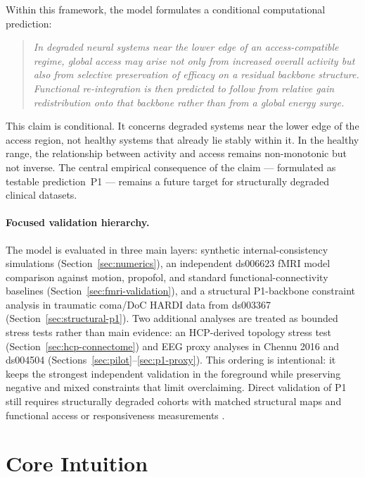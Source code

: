 \documentclass[11pt,a4paper]{article}
\theoremstyle{plain}
\theoremstyle{definition}
\theoremstyle{remark}
\begin{document}
Within this framework, the model formulates a conditional computational prediction:

\begin{quote}
\itshape
In degraded neural systems near the lower edge of an access-compatible regime, global access may arise not only from increased overall activity but also from selective preservation of efficacy on a residual backbone structure. Functional re-integration is then predicted to follow from relative gain redistribution onto that backbone rather than from a global energy surge.
\end{quote}

This claim is conditional. It concerns degraded systems near the lower edge of the access region, not healthy systems that already lie stably within it. In the healthy range, the relationship between activity and access remains non-monotonic but not inverse. The central empirical consequence of the claim --- formulated as testable prediction~P1 --- remains a future target for structurally degraded clinical datasets.

\paragraph{Focused validation hierarchy.}
The model is evaluated in three main layers: synthetic internal-consistency simulations (Section~\ref{sec:numerics}), an independent ds006623 fMRI model comparison against motion, propofol, and standard functional-connectivity baselines (Section~\ref{sec:fmri-validation}), and a structural P1-backbone constraint analysis in traumatic coma/DoC HARDI data from ds003367 (Section~\ref{sec:structural-p1}). Two additional analyses are treated as bounded stress tests rather than main evidence: an HCP-derived topology stress test (Section~\ref{sec:hcp-connectome}) and EEG proxy analyses in Chennu 2016 and ds004504 (Sections~\ref{sec:pilot}--\ref{sec:p1-proxy}). This ordering is intentional: it keeps the strongest independent validation in the foreground while preserving negative and mixed constraints that limit overclaiming. Direct validation of P1 still requires structurally degraded cohorts with matched structural maps and functional access or responsiveness measurements \citep{laureys2004,giacino2014}.


\section{Core Intuition}
\label{sec:intuition}
\end{document}
